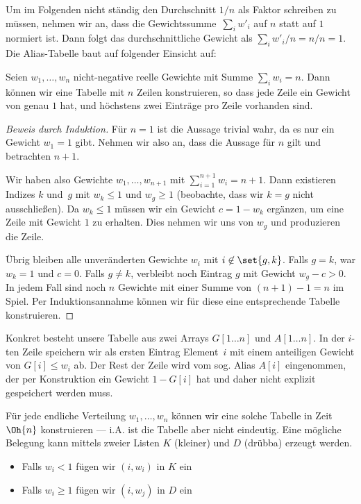 Um im Folgenden nicht ständig den Durchschnitt $1/n$ als Faktor schreiben zu müssen, nehmen wir an, dass die Gewichtssumme~$\sum_i w'_i$ auf $n$ statt auf $1$ normiert ist.
Dann folgt das durchschnittliche Gewicht als $\sum_i w'_i / n = n /n = 1$.
Die Alias-Tabelle baut auf folgender Einsicht auf:

\begin{theorem}
    Seien $w_1, \ldots, w_n$ nicht-negative reelle Gewichte mit Summe $\sum_i w_i = n$.
    Dann können wir eine Tabelle mit $n$ Zeilen konstruieren, so dass jede Zeile ein Gewicht von genau $1$ hat, und höchstens zwei Einträge pro Zeile vorhanden sind.
\end{theorem}

\begin{proof}[Beweis durch Induktion]
    Für $n=1$ ist die Aussage trivial wahr, da es nur ein Gewicht $w_1 = 1$ gibt.
    Nehmen wir also an, dass die Aussage für $n$ gilt und betrachten $n + 1$.

    Wir haben also Gewichte $w_1, \ldots, w_{n+1}$ mit $\sum_{i=1}^{n+1} w_i = n + 1$.
    Dann existieren Indizes $k$ und~$g$ mit $w_k \le 1$ und $w_g \ge 1$ (beobachte, dass wir $k = g$ nicht ausschließen).
    Da $w_k \le 1$ müssen wir ein Gewicht $c = 1 - w_k$ ergänzen, um eine Zeile mit Gewicht $1$ zu erhalten.
    Dies nehmen wir uns von $w_g$ und produzieren die Zeile.

    Übrig bleiben alle unveränderten Gewichte $w_i$ mit $i \not\in \set{g, k}$.
    Falls $g = k$, war $w_k = 1$ und $c=0$.
    Falls $g \ne k$, verbleibt noch Eintrag $g$ mit Gewicht $w_g - c > 0$.
    In jedem Fall sind noch $n$ Gewichte mit einer Summe von $(n+1) - 1 = n$ im Spiel.
    Per Induktionsannahme können wir für diese eine entsprechende Tabelle konstruieren.
\end{proof}

Konkret besteht unsere Tabelle aus zwei Arrays $G[1\ldots n]$ und $A[1\ldots n]$.
In der $i$-ten Zeile speichern wir als ersten Eintrag Element~$i$ mit einem anteiligen Gewicht von $G[i] \le w_i$ ab.
Der Rest der Zeile wird vom sog. Alias $A[i]$ eingenommen, der per Konstruktion ein Gewicht $1 - G[i]$ hat und daher nicht explizit gespeichert werden muss.

Für jede endliche Verteilung $w_1, \ldots, w_n$ können wir eine solche Tabelle in Zeit $\Oh{n}$ konstruieren --- i.A. ist die Tabelle aber nicht eindeutig.
Eine mögliche Belegung kann mittels zweier Listen $K$ (kleiner) und $D$ (drübba) erzeugt werden.
\begin{itemize}
    \item Falls $w_i < 1$ fügen wir $(i, w_i)$ in $K$ ein
    \item Falls $w_i \ge 1$ fügen wir $(i, w_j)$ in $D$ ein
\end{itemize}

